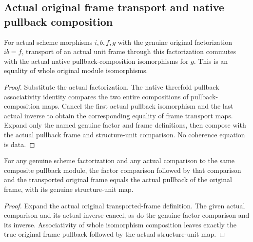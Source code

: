 \subsection{Actual original frame transport and native pullback composition}

\begin{lemma}
\label{alggeom:actual-original-frame-pullback-composition}
\leanok
For actual scheme morphisms $i,b,f,g$ with the genuine original factorization
$ib=f$, transport of an actual unit frame through this factorization commutes
with the actual native pullback-composition isomorphisms for $g$. This is an
equality of whole original module isomorphisms.
\end{lemma}
\begin{proof}
Substitute the actual factorization. The native threefold pullback associativity
identity compares the two entire compositions of pullback-composition maps.
Cancel the first actual pullback isomorphism and the last actual inverse to
obtain the corresponding equality of frame transport maps. Expand only the
named genuine factor and frame definitions, then compose with the actual
pullback frame and structure-unit comparison. No coherence equation is data.
\end{proof}

\begin{lemma}
\label{alggeom:actual-original-frame-factor-pairing}
\leanok
For any genuine scheme factorization and any actual comparison to the same
composite pullback module, the factor comparison followed by that comparison
and the transported original frame equals the actual pullback of the original
frame, with its genuine structure-unit map.
\end{lemma}
\begin{proof}
Expand the actual original transported-frame definition. The given actual
comparison and its actual inverse cancel, as do the genuine factor comparison
and its inverse. Associativity of whole isomorphism composition leaves exactly
the true original frame pullback followed by the actual structure-unit map.
\end{proof}
